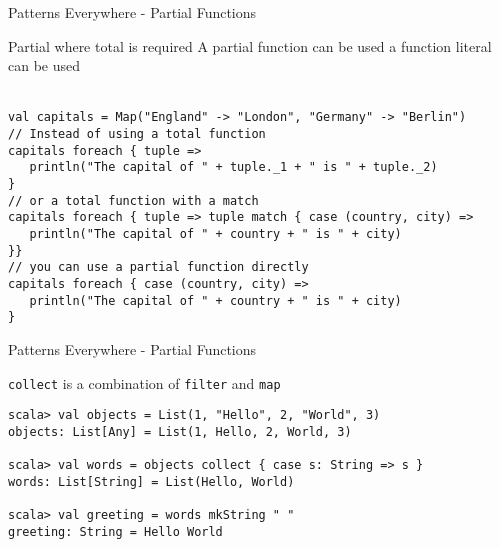 \begin{frame}[fragile]{Patterns Everywhere - Partial Functions}
\begin{block}{Partial where total is required}
A partial function can be used  a function literal can be
used
\end{block}
\lstinline!!\\
\lstinline!val capitals = Map("England" -> "London", "Germany" -> "Berlin")!\\
\lstinline!// Instead of using a total function!\\
\lstinline!capitals foreach { tuple => !\\
\lstinline!   println("The capital of " + tuple._1 + " is " + tuple._2)!\\
\lstinline!}!\\
\lstinline!// or a total function with a match!\\
\lstinline!capitals foreach { tuple => tuple match { case (country, city) =>!\\
\lstinline!   println("The capital of " + country + " is " + city)!\\
\lstinline!}}!\\
\lstinline!// you can use a partial function directly!\\
\lstinline!capitals foreach { case (country, city) =>!\\
\lstinline!   println("The capital of " + country + " is " + city)!\\
\lstinline!}!
\end{frame}

\begin{frame}[fragile]{Patterns Everywhere - Partial Functions}
\begin{exampleblock}{\lstinline!collect! is a combination of \lstinline!filter! and \lstinline!map!}
\begin{lstlisting}
scala> val objects = List(1, "Hello", 2, "World", 3)
objects: List[Any] = List(1, Hello, 2, World, 3)

scala> val words = objects collect { case s: String => s }
words: List[String] = List(Hello, World)

scala> val greeting = words mkString " "
greeting: String = Hello World
\end{lstlisting}
\end{exampleblock}
\end{frame}

